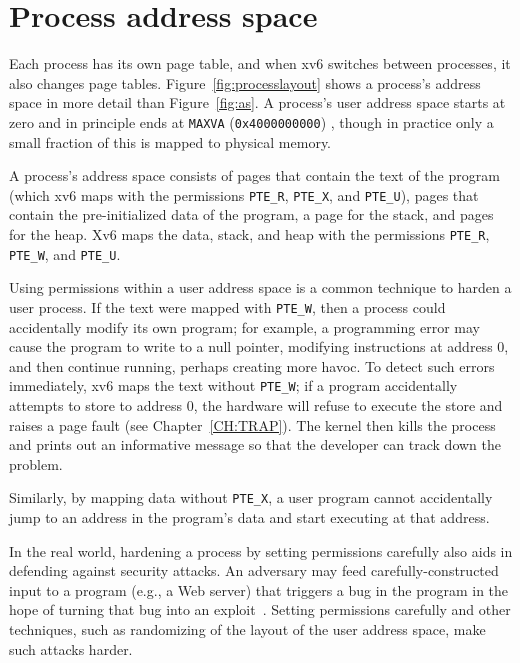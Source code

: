\section{Process address space}

Each process has its own page table, and when xv6 switches between
processes, it also changes page tables.
Figure~\ref{fig:processlayout} shows a process's address space in more
detail than Figure~\ref{fig:as}.  A process's user address space
starts at zero and in principle ends at
\texttt{MAXVA}
({\tt 0x4000000000})
, though in practice
only a small fraction of this is mapped to physical memory.

A process's address space consists of pages that contain the text of
the program (which xv6 maps with the permissions \lstinline{PTE_R},
\lstinline{PTE_X}, and \lstinline{PTE_U}), pages that contain the
pre-initialized data of the program, a page for the stack, and pages
for the heap.  Xv6 maps the data, stack, and heap with the permissions
\lstinline{PTE_R}, \lstinline{PTE_W}, and \lstinline{PTE_U}.

Using permissions within a user address space is a common technique to
harden a user process.  If the text were mapped with
\lstinline{PTE_W}, then a process could accidentally modify its own
program; for example, a programming error may cause the program to
write to a null pointer, modifying instructions at address 0, and then
continue running, perhaps creating more havoc.  To detect such errors
immediately, xv6 maps the text without \lstinline{PTE_W}; if a program
accidentally attempts to store to address 0, the hardware will refuse
to execute the store and raises a page fault (see
Chapter~\ref{CH:TRAP}).  The kernel then kills the process and
prints out an informative message so that the developer can track down
the problem.

Similarly, by mapping data without \lstinline{PTE_X}, a user program
cannot accidentally jump to an address in the program's data and start
executing at that address.

In the real world, hardening a process by setting permissions
carefully also aids in defending against security attacks.  An
adversary may feed carefully-constructed input to a program (e.g., a
Web server) that triggers a bug in the program in the hope of turning
that bug into an exploit~\cite{aleph:smashing}.  Setting permissions
carefully and other techniques, such as randomizing of the layout of the
user address space, make such attacks harder.

